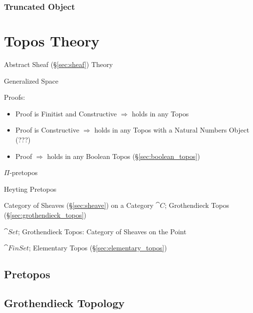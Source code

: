 \subsubsection{Truncated Object}\label{sec:truncated_object}



\section{Topos Theory}\label{sec:topos_theory}

Abstract Sheaf (\S\ref{sec:sheaf}) Theory

Generalized Space

Proofs:
\begin{itemize}
  \item Proof is Finitist and Constructive $\Rightarrow$ holds in any
    Topos
  \item Proof is Constructive $\Rightarrow$ holds in any Topos with a
    Natural Numbers Object (???)
  \item Proof $\Rightarrow$ holds in any Boolean Topos
    (\S\ref{sec:boolean_topos})
\end{itemize}

$\Pi$-pretopos

Heyting Pretopos

Category of Sheaves (\S\ref{sec:sheave}) on a Category $\cat{C}$;
Grothendieck Topos (\S\ref{sec:grothendieck_topos})

$\cat{Set}$; Grothendieck Topos: Category of Sheaves on the Point

$\cat{FinSet}$; Elementary Topos (\S\ref{sec:elementary_topos})



\subsection{Pretopos}\label{sec:pretopos}

\subsection{Grothendieck Topology}\label{sec:grothendieck_topology}

